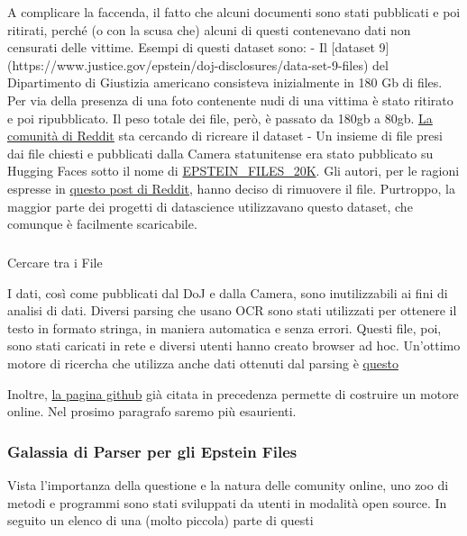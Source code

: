 \documentclass[
  italian,
  a4paper,
]{article}
\makeatletter
\let\oldsubparagraph\subparagraph
\renewcommand{\subparagraph}{
    \@ifstar
      \xxxSubParagraphStar
      \xxxSubParagraphNoStar
  }
\newcommand{\xxxSubParagraphStar}[1]{\oldsubparagraph*{#1}\mbox{}}
\newcommand{\xxxSubParagraphNoStar}[1]{\oldsubparagraph{#1}\mbox{}}
\makeatother
\begin{document}
A complicare la faccenda, il fatto che alcuni documenti sono stati
pubblicati e poi ritirati, perché (o con la scusa che) alcuni di questi
contenevano dati non censurati delle vittime. Esempi di questi dataset
sono: - Il {[}dataset 9{]}
(https://www.justice.gov/epstein/doj-disclosures/data-set-9-files) del
Dipartimento di Giustizia americano consisteva inizialmente in 180 Gb di
files. Per via della presenza di una foto contenente nudi di una vittima
è stato ritirato e poi ripubblicato. Il peso totale dei file, però, è
passato da 180gb a 80gb.
\href{https://www.reddit.com/r/DataHoarder/comments/1qsfv3j/epstein_9_10_11_12_reddit_keeps_nuking_thread_we/}{La
comunità di Reddit} sta cercando di ricreare il dataset - Un insieme di
file presi dai file chiesti e pubblicati dalla Camera statunitense era
stato pubblicato su Hugging Faces sotto il nome di
\href{https://huggingface.co/datasets/tensonaut/EPSTEIN_FILES_20K}{EPSTEIN\_FILES\_20K}.
Gli autori, per le ragioni espresse in
\href{https://www.reddit.com/r/LocalLLaMA/comments/1p4urm7/we_are_considering_removing_the_epstein_files/}{questo
post di Reddit}, hanno deciso di rimuovere il file. Purtroppo, la
maggior parte dei progetti di datascience utilizzavano questo dataset,
che comunque è facilmente scaricabile.

\subparagraph{Cercare tra i File}\label{cercare-tra-i-file}

I dati, così come pubblicati dal DoJ e dalla Camera, sono inutilizzabili
ai fini di analisi di dati. Diversi parsing che usano OCR sono stati
utilizzati per ottenere il testo in formato stringa, in maniera
automatica e senza errori. Questi file, poi, sono stati caricati in rete
e diversi utenti hanno creato browser ad hoc. Un'ottimo motore di
ricercha che utilizza anche dati ottenuti dal parsing è
\href{https://epsteingraph.com/}{questo}

Inoltre,
\href{https://github.com/markramm/EpsteinFiles/blob/main/DOCUMENT_SOURCES.md}{la
pagina github} già citata in precedenza permette di costruire un motore
online. Nel prosimo paragrafo saremo più esaurienti.

\subsubsection{Galassia di Parser per gli Epstein
Files}\label{galassia-di-parser-per-gli-epstein-files}

Vista l'importanza della questione e la natura delle comunity online,
uno zoo di metodi e programmi sono stati sviluppati da utenti in
modalità open source. In seguito un elenco di una (molto piccola) parte
di questi
\end{document}
